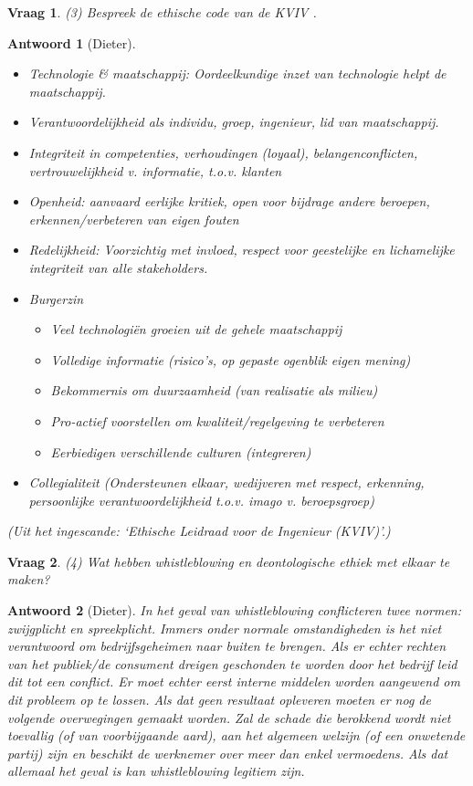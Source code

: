 \documentclass{article}
\theoremstyle{nonumberplain}
\newtheorem{question}{Vraag}
\newtheorem{answer}{Antwoord}
\begin{document}
\begin{question}
(3)	Bespreek de ethische code van de KVIV .
\end{question}
\begin{answer}[Dieter]
	\begin{itemize}
		\item Technologie \& maatschappij: Oordeelkundige inzet van technologie helpt de maatschappij.
		\item Verantwoordelijkheid als individu, groep, ingenieur, lid van maatschappij. 
		\item Integriteit in competenties, verhoudingen (loyaal), belangenconflicten, vertrouwelijkheid v. informatie, t.o.v. klanten
		\item Openheid: aanvaard eerlijke kritiek, open voor bijdrage andere beroepen, erkennen/verbeteren van eigen fouten
		\item Redelijkheid: Voorzichtig met invloed, respect voor geestelijke en lichamelijke integriteit van alle stakeholders.
		\item Burgerzin 
			\begin{itemize}
				\item Veel technologi\"en groeien uit de gehele maatschappij
				\item Volledige informatie (risico's, op gepaste ogenblik eigen mening)
				\item Bekommernis om duurzaamheid (van realisatie als milieu)
				\item Pro-actief voorstellen om kwaliteit/regelgeving te verbeteren
				\item Eerbiedigen verschillende culturen (integreren)
			\end{itemize} 
		\item Collegialiteit (Ondersteunen elkaar, wedijveren met respect, erkenning, persoonlijke verantwoordelijkheid t.o.v. imago v. beroepsgroep)
	\end{itemize}

	\textit{(Uit het ingescande: `Ethische Leidraad voor de Ingenieur (KVIV)'.)}
\end{answer}

\begin{question}
(4)	Wat hebben whistleblowing en deontologische ethiek met elkaar te maken?
\end{question}
\begin{answer}[Dieter]
	In het geval van whistleblowing conflicteren twee normen: zwijgplicht en spreekplicht.
	Immers onder normale omstandigheden is het niet verantwoord om bedrijfsgeheimen naar buiten te brengen.
	Als er echter rechten van het publiek/de consument dreigen geschonden te worden door het bedrijf leid dit tot een conflict.
	Er moet echter eerst interne middelen worden aangewend om dit probleem op te lossen. Als dat geen resultaat opleveren moeten er nog de volgende overwegingen gemaakt worden. Zal de schade die berokkend wordt niet toevallig (of van voorbijgaande aard), aan het algemeen welzijn (of een onwetende partij) zijn en beschikt de werknemer over meer dan enkel vermoedens. Als dat allemaal het geval is kan whistleblowing legitiem zijn.
\end{answer}
\end{document}
